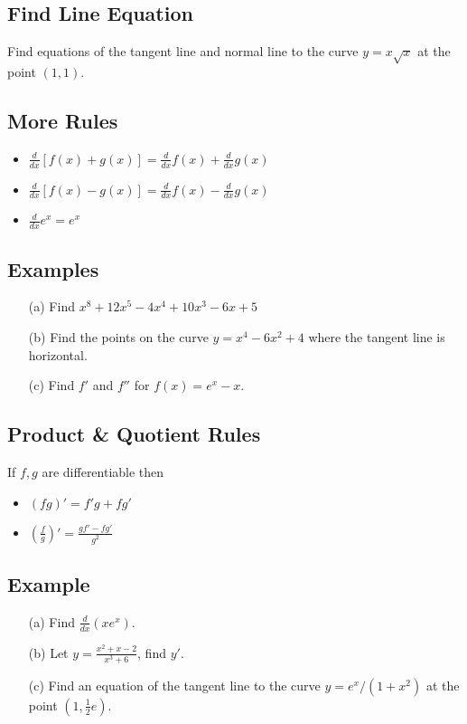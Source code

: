 \documentclass[12pt]{book}
\theoremstyle{definition}
\begin{document}
\subsection*{Find Line Equation}
Find equations of the tangent line and normal line to the curve $y=x\sqrt{x}$ at the point $(1,1)$.\vspace{4cm}
\begin{tcolorbox}
\subsection*{More Rules}
\begin{itemize}
    \item $\displaystyle \frac{d}{dx}[f(x)+g(x)]=\frac{d}{dx}f(x)+\frac{d}{dx}g(x)$
    \item $\displaystyle \frac{d}{dx}[f(x)-g(x)]=\frac{d}{dx}f(x)-\frac{d}{dx}g(x)$
    \item $\displaystyle \frac{d}{dx}e^x=e^x$
\end{itemize}
\end{tcolorbox}
\subsection*{Examples}
\begin{itemize}
    \item[(a)] Find $\displaystyle x^8+12x^5-4x^4+10x^3-6x+5$\vspace{4cm}
    \item[(b)] Find the points on the curve $y=x^4-6x^2+4$ where the tangent line is horizontal.\vspace{4cm}
    \item[(c)] Find $f'$ and $f''$ for $f(x)=e^x-x$.
\end{itemize}
\raggedbottom
\clearpage
\begin{tcolorbox}
\subsection*{Product \& Quotient Rules} If $f,g$ are differentiable then
\begin{itemize}
    \item $\displaystyle \left(fg\right)'=f'g+fg'$
    \item $\displaystyle\left(\frac{f}{g}\right)'=\frac{gf'-fg'}{g^2}$
\end{itemize}
\end{tcolorbox}
\subsection*{Example}
\begin{itemize}
    \item[(a)] Find $\displaystyle\frac{d}{dx}\left(xe^x\right).$\vspace{4cm}
    \item[(b)] Let $y=\frac{x^2+x-2}{x^3+6}$, find $y'$.\vspace{4cm}
    \item[(c)] Find an equation of the tangent line to the curve $y=e^x/(1+x^2)$ at the point $(1,\frac{1}{2}e)$.
\end{itemize}
\end{document}
